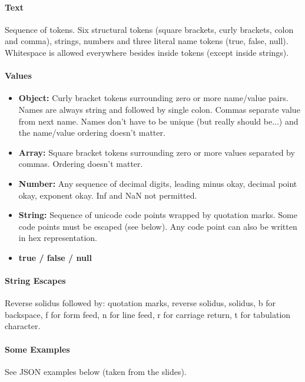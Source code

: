 \paragraph{Text}
Sequence of tokens. Six structural tokens (square brackets, curly brackets, colon and comma), strings, numbers and three literal name tokens (true, false, null). Whitespace is allowed everywhere besides inside tokens (except inside strings).

\paragraph{Values}
\begin{itemize}
    \item \textbf{Object:} Curly bracket tokens surrounding zero or more name/value pairs. Names are always string and followed by single colon. Commas separate value from next name. Names don't have to be unique (but really should be...) and the name/value ordering doesn't matter. %
    \item \textbf{Array:} Square bracket tokens surrounding zero or more values separated by commas. Ordering doesn't matter.
    \item \textbf{Number:} Any sequence of decimal digits, leading minus okay, decimal point okay, exponent okay. Inf and NaN not permitted.
    \item \textbf{String:} Sequence of unicode code points wrapped by quotation marks. Some code points must be escaped (see below). Any code point can also be written in hex representation. %
    \item \textbf{true / false / null}
\end{itemize}


\paragraph{String Escapes}
Reverse solidus followed by: quotation marks, reverse solidus, solidus, b for backspace, f for form feed, n for line feed, r for carriage return, t for tabulation character.


\paragraph{Some Examples}
See JSON examples below (taken from the slides).

